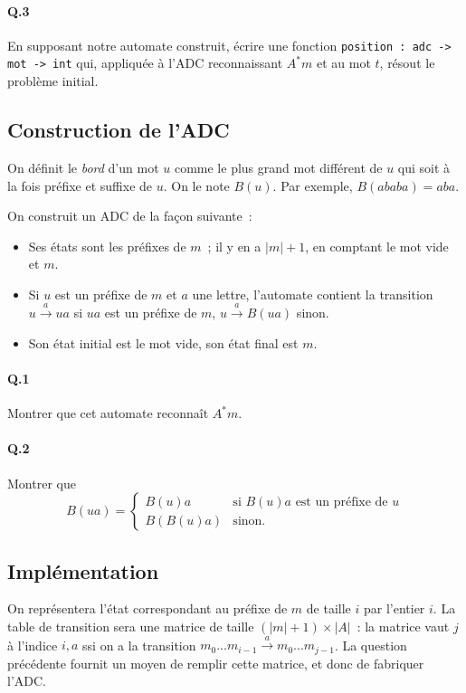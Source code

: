 \documentclass[10pt,a4paper]{article}
\begin{document}
\paragraph{Q.3} En supposant notre automate construit, écrire une fonction 
\texttt{position : adc -> mot -> int} qui, appliquée à l'ADC reconnaissant $A^* m$ 
et au mot $t$, résout le problème initial.
\subsection{Construction de l'ADC}
On définit le \textit{bord} d'un mot $u$ comme le plus grand mot différent de $u$ 
qui soit à la fois préfixe et suffixe de $u$. On le note $B(u)$. Par exemple,
$B(ababa) = aba$.

On construit un ADC de la façon suivante~:
\begin{itemize}
\item Ses états sont les préfixes de $m$~; il y en a $|m|+1$, en comptant le mot
vide et $m$.
\item Si $u$ est un préfixe de $m$ et $a$ une lettre, l'automate contient la 
transition $u \xrightarrow{a} ua$ si $ua$ est un préfixe de $m$, 
$u \xrightarrow{a} B(ua)$ sinon.
\item Son état initial est le mot vide, son état final est $m$.
\end{itemize}
\paragraph{Q.1} Montrer que cet automate reconnaît $A^* m$.
\paragraph{Q.2} Montrer que 
\[B(ua) = \left\{ 
    \begin{array}{ll}
		B(u)a  & \mbox{si } B(u)a\mbox{ est un préfixe de }u \\
		B(B(u)a) & \mbox{sinon.}
	\end{array} \right. \]
\subsection{Implémentation}
On représentera l'état correspondant au préfixe de $m$ de taille $i$ par l'entier
$i$. La table de transition sera une matrice de taille $(|m|+1) \times |A|$~:
la matrice vaut $j$ à l'indice $i,a$ ssi on a la transition $m_0 ... m_{i-1} 
\xrightarrow{a} m_0 ... m_{j-1}$. La question précédente fournit un moyen de 
remplir cette matrice, et donc de fabriquer l'ADC.
\end{document}
